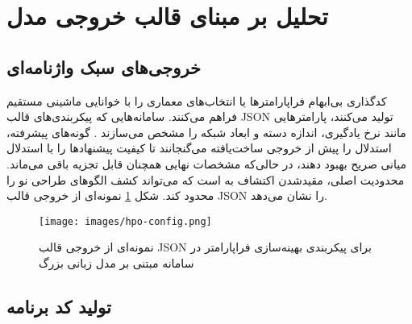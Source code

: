 
\section{تحلیل بر مبنای قالب خروجی مدل}

\subsection{خروجی‌های سبک واژنامه‌ای}

 کدگذاری بی‌ابهام فراپارامترها یا انتخاب‌های معماری را با خوانایی ماشینی مستقیم فراهم می‌کنند. سامانه‌هایی که پیکربندی‌های قالب JSON تولید می‌کنند، پارامترهایی مانند نرخ یادگیری، اندازه دسته و ابعاد شبکه را مشخص می‌سازند \cite{zhang2023usingLLMforHPO, liu2025agenthpo}. گونه‌های پیشرفته، استدلال  را پیش از خروجی ساخت‌یافته می‌گنجانند تا کیفیت پیشنهادها را با استدلال میانی صریح بهبود دهند، در حالی‌که مشخصات نهایی همچنان قابل تجزیه باقی می‌ماند. محدودیت اصلی، مقیدشدن اکتشاف به  است که می‌تواند کشف الگوهای طراحی نو را محدود کند. شکل \ref{fig:hpo-config} نمونه‌ای از خروجی قالب JSON را نشان می‌دهد.
\begin{figure}[h!]
    \centering
    \texttt{[image: images/hpo-config.png]}
    \caption[نمونه ای از خروجی قالب واژنامه‌ای]{نمونه‌ای از خروجی قالب JSON برای پیکربندی بهینه‌سازی فراپارامتر در سامانه مبتنی بر مدل زبانی بزرگ \cite{zhang2023usingLLMforHPO}
    }
    \label{fig:hpo-config}
\end{figure}
\subsection{تولید کد برنامه}

